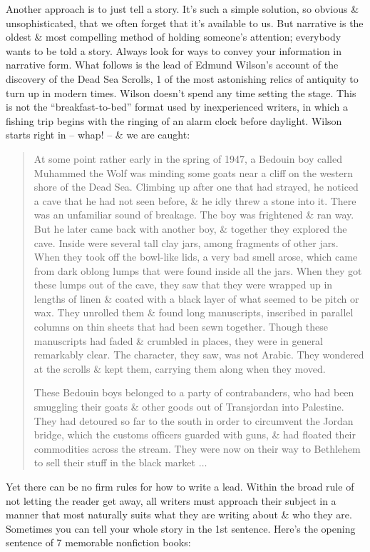 \documentclass{article}
\begin{document}
Another approach is to just tell a story. It's such a simple solution, so obvious \& unsophisticated, that we often forget that it's available to us. But narrative is the oldest \& most compelling method of holding someone's attention; everybody wants to be told a story. Always look for ways to convey your information in narrative form. What follows is the lead of Edmund Wilson's account of the discovery of the Dead Sea Scrolls, 1 of the most astonishing relics of antiquity to turn up in modern times. Wilson doesn't spend any time setting the stage. This is not the ``breakfast-to-bed'' format used by inexperienced writers, in which a fishing trip begins with the ringing of an alarm clock before daylight. Wilson starts right in -- whap! -- \& we are caught:
\begin{quotation}
	At some point rather early in the spring of 1947, a Bedouin boy called Muhammed the Wolf was minding some goats near a cliff on the western shore of the Dead Sea. Climbing up after one that had strayed, he noticed a cave that he had not seen before, \& he idly threw a stone into it. There was an unfamiliar sound of breakage. The boy was frightened \& ran way. But he later came back with another boy, \& together they explored the cave. Inside were several tall clay jars, among fragments of other jars. When they took off the bowl-like lids, a very bad smell arose, which came from dark oblong lumps that were found inside all the jars. When they got these lumps out of the cave, they saw that they were wrapped up in lengths of linen \& coated with a black layer of what seemed to be pitch or wax. They unrolled them \& found long manuscripts, inscribed in parallel columns on thin sheets that had been sewn together. Though these manuscripts had faded \& crumbled in places, they were in general remarkably clear. The character, they saw, was not Arabic. They wondered at the scrolls \& kept them, carrying them along when they moved.
	
	These Bedouin boys belonged to a party of contrabanders, who had been smuggling their goats \& other goods out of Transjordan into Palestine. They had detoured so far to the south in order to circumvent the Jordan bridge, which the customs officers guarded with guns, \& had floated their commodities across the stream. They were now on their way to Bethlehem to sell their stuff in the black market $\ldots$
\end{quotation}
Yet there can be no firm rules for how to write a lead. Within the broad rule of not letting the reader get away, all writers must approach their subject in a manner that most naturally suits what they are writing about \& who they are. Sometimes you can tell your whole story in the 1st sentence. Here's the opening sentence of 7 memorable nonfiction books:
\end{document}
